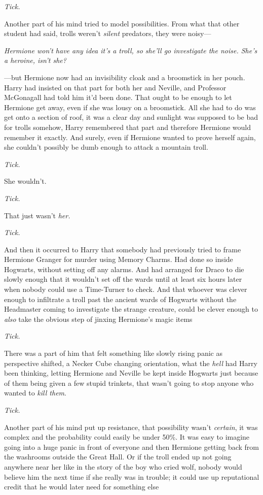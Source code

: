 \emph{Tick.}

Another part of his mind tried to model possibilities. From what that other
student had said, trolls weren't \emph{silent} predators, they were noisy---

\emph{Hermione won't have any idea it's a troll, so she'll go investigate the
noise. She's a heroine, isn't she?}

---but Hermione now had an invisibility cloak and a broomstick in her pouch.
Harry had insisted on that part for both her and Neville, and Professor
McGonagall had told him it'd been done. That ought to be enough to let Hermione
get away, even if she was lousy on a broomstick. All she had to do was get onto
a section of roof, it was a clear day and sunlight was supposed to be bad for
trolls somehow, Harry remembered that part and therefore Hermione would
remember it exactly. And surely, even if Hermione wanted to prove herself
again, she couldn't possibly be dumb enough to attack a mountain troll.

\emph{Tick.}

She wouldn't.

\emph{Tick.}

That just wasn't \emph{her.}

\emph{Tick.}

And then it occurred to Harry that somebody had previously tried to frame
Hermione Granger for murder using Memory Charms. Had done so inside Hogwarts,
without setting off any alarms. And had arranged for Draco to die slowly enough
that it wouldn't set off the wards until at least six hours later when nobody
could use a Time-Turner to check. And that whoever was clever enough to
infiltrate a troll past the ancient wards of Hogwarts without the Headmaster
coming to investigate the strange creature, could be clever enough to
\emph{also} take the obvious step of jinxing Hermione's magic items{\el}

\emph{Tick.}

There was a part of him that felt something like slowly rising panic as
perspective shifted, a Necker Cube changing orientation, what the \emph{hell}
had Harry been thinking, letting Hermione and Neville be kept inside Hogwarts
just because of them being given a few stupid trinkets, that wasn't going to
stop anyone who wanted to \emph{kill them}.

\emph{Tick.}

Another part of his mind put up resistance, that possibility wasn't
\emph{certain}, it was complex and the probability could easily be under 50\%.
It was easy to imagine going into a huge panic in front of everyone and then
Hermione getting back from the washrooms outside the Great Hall. Or if the
troll ended up not going anywhere near her{\el} like in the story of the boy
who cried wolf, nobody would believe him the next time if she really was in
trouble; it could use up reputational credit that he would later need for
something else{\el}

